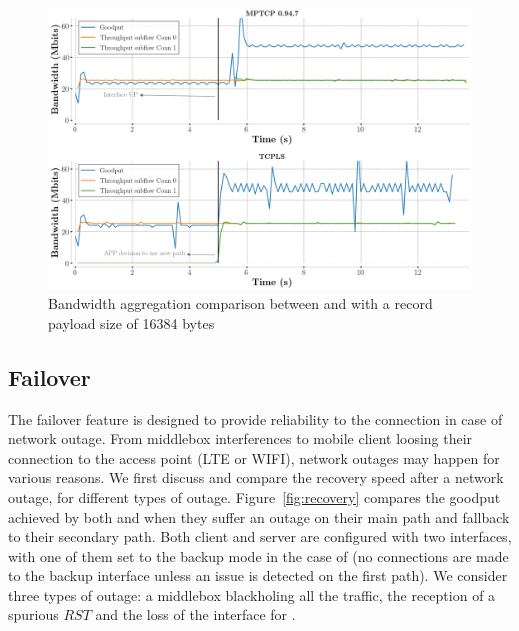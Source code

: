 \begin{figure}[!t]
  \begin{center}
    \includegraphics[width=\columnwidth]{figures/aggregate_dual.png}
  \end{center} 
  \caption{Bandwidth aggregation comparison between \mptcp and
    \tcpls with a record payload size of 16384 bytes}
  \label{fig:multipath_aggregation}
\end{figure}

\subsection{Failover}

The failover feature is designed to provide reliability to the \tcpls connection
in case of network outage. From middlebox interferences to mobile client loosing
their connection to the access point (LTE or WIFI), network outages may happen
for various reasons. We first discuss and compare the recovery speed
after a network outage, for different types of outage. Figure~\ref{fig:recovery}
compares the goodput achieved by both \mptcp and \tcpls when they suffer an
outage on their main path and fallback to their secondary path. Both client and
server are configured with two interfaces, with one of them set to the backup
mode in the case of \mptcp (no connections are made to the backup interface
unless an issue is detected on the first path). We consider three types of
outage: a middlebox blackholing all the traffic, the reception of a spurious
$RST$ and the loss of the interface for \mptcp.

